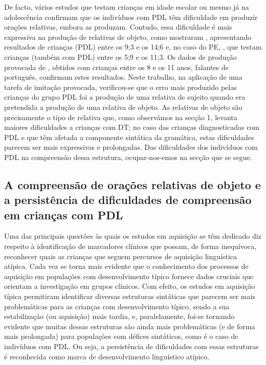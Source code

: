 \documentclass[output=paper,colorlinks,citecolor=brown,booklanguage=portuguese]{langscibook}
\begin{document}
De facto, vários estudos que testam crianças em idade escolar ou mesmo já na adolescência confirmam que os indivíduos com PDL têm dificuldade em produzir orações relativas, embora as produzam. Contudo, essa dificuldade é mais expressiva na produção de relativas de objeto, como mostraram \citet{Novogrodsky2006}, apresentando resultados de crianças (PDL) entre os 9;3 e os 14;6 e, no caso do PE, \citet{Costa2009}, que testam crianças (também com PDL) entre os 5;9 e os 11;3. Os dados de produção provocada de \citet{Martinsempreparacao}, obtidos com crianças entre os 8 e os 11 anos, falantes de português, confirmam estes resultados. Neste trabalho, na aplicação de uma tarefa de imitação provocada, verificou-se que o erro mais produzido pelas crianças do grupo PDL foi a produção de uma relativa de sujeito quando era pretendida a produção de uma relativa de objeto. As relativas de objeto são precisamente o tipo de relativa que, como observámos na secção 1, levanta maiores dificuldades a crianças com DT; no caso das crianças diagnosticadas com PDL e que têm afetada a componente sintática da gramática, estas dificuldades parecem ser mais expressivas e prolongadas. Das dificuldades dos indivíduos com PDL na compreensão dessa estrutura, ocupar-nos-emos na secção que se segue.

\subsection{A compreensão de orações relativas de objeto e a persistência de dificuldades de compreensão em crianças com PDL }
Uma das principais questões às quais os estudos em aquisição se têm dedicado diz respeito à identificação de marcadores clínicos que possam, de forma inequívoca, reconhecer quais as crianças que seguem percursos de aquisição linguística atípica. Cada vez se torna mais evidente que o conhecimento dos processos de aquisição em populações com desenvolvimento típico fornece dados cruciais que orientam a investigação em grupos clínicos. Com efeito, os estudos em aquisição típica permitiram identificar diversas estruturas sintáticas que parecem ser mais problemáticas para as crianças com desenvolvimento típico, sendo a sua estabilização (ou aquisição) mais tardia, e, paralelamente, foi-se tornando evidente que muitas dessas estruturas são ainda mais problemáticas (e de forma mais prolongada) para populações com défices sintáticos, como é o caso de indivíduos com PDL. Ou seja, a persistência de dificuldades com essas estruturas é reconhecida como marca de desenvolvimento linguístico atípico.
\end{document}
